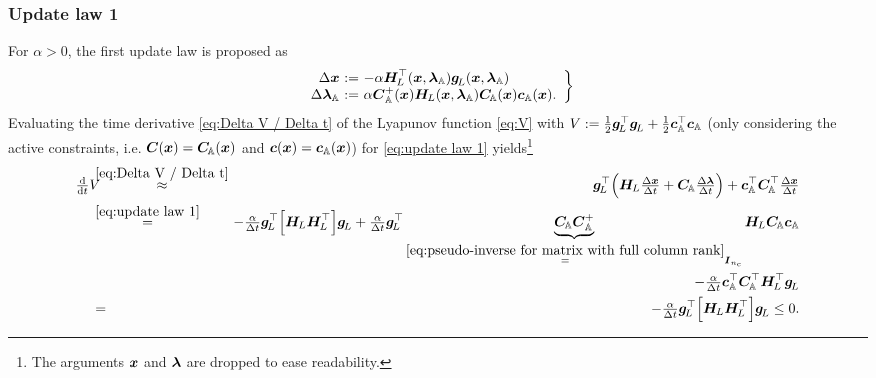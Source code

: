 \documentclass[journal]{IEEEtranTIE}
\begin{document}
\subsubsection{Update law 1}
For $\alpha >0$, the first update law is proposed as 
%
\begin{equation}\label{eq:update law 1}
\left.\begin{array}{rcl}
    \Delta\mv{x} & \!\!\!\! := \!\!\!\! & -\alpha \mm{H}^\top_{\! L}(\mv{x},\mv{\lambda}_{\mathbb{A}})\mv{g}_{\! L}(\mv{x},\mv{\lambda}_{\mathbb{A}})  \\
    \Delta\mv{\lambda}_{\mathbb{A}}  & \!\!\!\! := \!\!\!\! & \alpha \mv{C}^+_{\mathbb{A}}(\mv{x})\mm{H}_{\! L}(\mv{x},\mv{\lambda}_{\mathbb{A}})\mm{C}_{\!\mathbb{A}}(\mv{x})\mv{c}_{\mathbb{A}}(\mv{x}).
\end{array}
\right\}
\end{equation}
%
Evaluating the time derivative \eqref{eq:Delta V / Delta t} of the Lyapunov function \eqref{eq:V} with $V := \tfrac{1}{2}\boldsymbol{g}_{\!L}^\top \boldsymbol{g}_{\!L} + \tfrac{1}{2}\boldsymbol{c}_{\mathbb{A}}^\top\boldsymbol{c}_{\mathbb{A}}$ (only considering the active constraints, i.e. $\boldsymbol{C}(\boldsymbol{x})=\boldsymbol{C}_{\!\mathbb{A}}(\boldsymbol{x})$ and $\boldsymbol{c}(\boldsymbol{x})=\boldsymbol{c}_{\mathbb{A}}(\boldsymbol{x})$) for \eqref{eq:update law 1} yields\footnote{The arguments $\boldsymbol{x}$ and $\boldsymbol{\lambda}$ are dropped to ease readability.}
%
\begin{eqnarray}
\ddtsmall V & \!\!\!\! \stackrel{\eqref{eq:Delta V / Delta t}}{\approx} \!\!\!\!  & \mv{g}_{\!L}^\top \Big( \mm{H}_{\! L}\tfrac{\Delta \mv{x}}{\Delta t}  + \mm{C}_{\!\mathbb{A}} \tfrac{\Delta \mv{\lambda}}{\Delta t}  \Big) + \mv{c}_{\mathbb{A}}^\top \mm{C}_{\!\mathbb{A}}^\top \tfrac{\Delta \mv{x}}{\Delta t} \notag \\
& \!\!\!\! \stackrel{\eqref{eq:update law 1}}{=} \!\!\!\! & -\tfrac{\alpha}{\Delta t}\mv{g}_{\!L}^\top \Big[ \mm{H}_{\! L} \mm{H}_{\! L}^\top \Big]\mv{g}_{\!L} + \tfrac{\alpha}{\Delta t} \mv{g}_{\!L}^\top \underbrace{\mm{C}_{\!\mathbb{A}}\mv{C}^+_{\mathbb{A}}}_{\stackrel{\eqref{eq:pseudo-inverse for matrix with full column rank}}{=}\mm{I}_{n_{\rm c}}}\mm{H}_{\! L}\mm{C}_{\!\mathbb{A}}\mv{c}_{\mathbb{A}}  \notag \\
 & & -\tfrac{\alpha}{\Delta t} \mv{c}_{\mathbb{A}}^\top \mm{C}_{\!\mathbb{A}}^\top \mm{H}_{\! L}^\top \mv{g}_{\!L} \notag \\ 
 & \!\!\!\! = \!\!\!\! & -\tfrac{\alpha}{\Delta t}\mv{g}_{\!L}^\top \Big[ \mm{H}_{\! L} \mm{H}_{\! L}^\top \Big]\mv{g}_{\!L} \leq 0.
\end{eqnarray}
%
\end{document}
